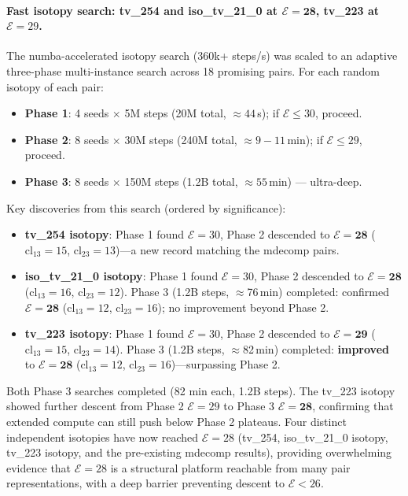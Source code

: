 \documentclass[11pt,a4paper]{article}
\theoremstyle{remark}
\newcommand{\cl}{\mathrm{cl}}
\newcommand{\E}{\mathcal{E}}
\begin{document}
\paragraph{Fast isotopy search: tv\_254 and iso\_tv\_21\_0 at $\E=\mathbf{28}$, tv\_223 at $\E=29$.}
The numba-accelerated isotopy search (360k+ steps/s) was scaled to an adaptive three-phase
multi-instance search across 18 promising pairs. For each random isotopy of each pair:
\begin{itemize}[noitemsep]
  \item \textbf{Phase 1}: 4 seeds $\times$ 5M steps (20M total, $\approx\!44$\,s); if $\E \leq 30$, proceed.
  \item \textbf{Phase 2}: 8 seeds $\times$ 30M steps (240M total, $\approx\!9{-}11$\,min); if $\E \leq 29$, proceed.
  \item \textbf{Phase 3}: 8 seeds $\times$ 150M steps (1.2B total, $\approx\!55$\,min) --- ultra-deep.
\end{itemize}
Key discoveries from this search (ordered by significance):
\begin{itemize}[noitemsep]
  \item \textbf{tv\_254 isotopy}: Phase 1 found $\E=30$, Phase 2 descended to $\E=\mathbf{28}$
    ($\cl_{13}=15$, $\cl_{23}=13$)---a new record matching the mdecomp pairs.
  \item \textbf{iso\_tv\_21\_0 isotopy}: Phase 1 found $\E=30$, Phase 2 descended to $\E=\mathbf{28}$
    ($\cl_{13}=16$, $\cl_{23}=12$). Phase 3 (1.2B steps, $\approx$76\,min) completed:
    confirmed $\E=\mathbf{28}$ ($\cl_{13}=12$, $\cl_{23}=16$); no improvement beyond Phase 2.
  \item \textbf{tv\_223 isotopy}: Phase 1 found $\E=30$, Phase 2 descended to $\E=\mathbf{29}$
    ($\cl_{13}=15$, $\cl_{23}=14$). Phase 3 (1.2B steps, $\approx$82\,min) completed:
    \textbf{improved} to $\E=\mathbf{28}$ ($\cl_{13}=12$, $\cl_{23}=16$)---surpassing Phase 2.
\end{itemize}
Both Phase 3 searches completed (82 min each, 1.2B steps). The tv\_223 isotopy showed
further descent from Phase 2 $\E=29$ to Phase 3 $\E=\mathbf{28}$, confirming that
extended compute can still push below Phase 2 plateaus. Four distinct independent isotopies
have now reached $\E=28$ (tv\_254, iso\_tv\_21\_0 isotopy, tv\_223 isotopy, and the
pre-existing mdecomp results), providing overwhelming evidence that $\E=28$ is a structural
platform reachable from many pair representations, with a deep barrier preventing descent
to $\E < 26$.
\end{document}
